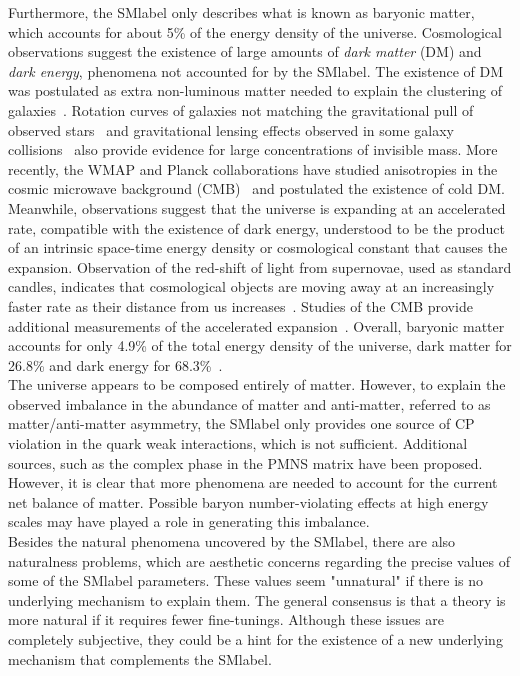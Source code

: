 Furthermore, the \acrshort{SMlabel} only describes what is known as baryonic matter, which accounts for about 5\% of the energy density of the universe. Cosmological observations suggest the existence of large amounts of \textit{dark matter} (DM) and \textit{dark energy}, phenomena not accounted for by the \acrshort{SMlabel}. The existence of DM was postulated as extra non-luminous matter needed to explain the clustering of galaxies~\cite{Zwicky2009}. Rotation curves of galaxies not matching the gravitational pull of observed stars~\cite{1981AJ.....86.1825B} and gravitational lensing effects observed in some galaxy collisions~\cite{Umetsu_2016} also provide evidence for large concentrations of invisible mass. More recently, the WMAP and Planck collaborations have studied anisotropies in the cosmic microwave background (CMB)~\cite{Bennett_2013,Planckcollab} and postulated the existence of cold DM. Meanwhile, observations suggest that the universe is expanding at an accelerated rate, compatible with the existence of dark energy, understood to be the product of an intrinsic space-time energy density or cosmological constant that causes the expansion. Observation of the red-shift of light from supernovae, used as standard candles, indicates that cosmological objects are moving away at an increasingly faster rate as their distance from us increases~\cite{1929PNAS...15..168H}. Studies of the CMB provide additional measurements of the accelerated expansion~\cite{Planckcollab}. Overall, baryonic matter accounts for only 4.9\% of the total energy density of the universe, dark matter for 26.8\% and dark energy for 68.3\%~\cite{Planckcollab}.\\

The universe appears to be composed entirely of matter. However, to explain the observed imbalance in the abundance of matter and anti-matter, referred to as matter/anti-matter asymmetry, the \acrshort{SMlabel} only provides one source of CP violation in the quark weak interactions, which is not sufficient. Additional sources, such as the complex phase in the PMNS matrix have been proposed. However, it is clear that more phenomena are needed to account for the current net balance of matter. Possible baryon number-violating effects at high energy scales may have played a role in generating this imbalance.\\

Besides the natural phenomena uncovered by the \acrshort{SMlabel}, there are also naturalness problems, which are aesthetic concerns regarding the precise values of some of the \acrshort{SMlabel} parameters. These values seem "unnatural" if there is no underlying mechanism to explain them. The general consensus is that a theory is more natural if it requires fewer fine-tunings. Although these issues are completely subjective, they could be a hint for the existence of a new underlying mechanism that complements the \acrshort{SMlabel}.\\

